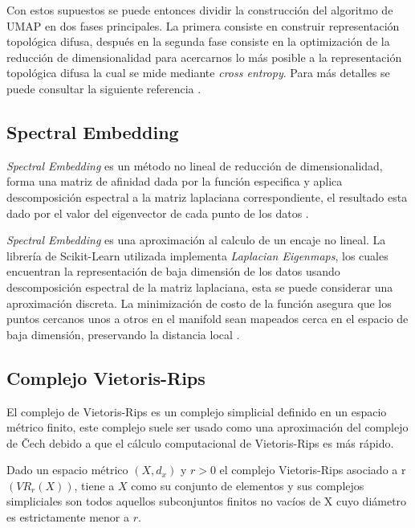 \documentclass{article}
\begin{document}
            Con estos supuestos se puede entonces dividir la construcción del algoritmo de UMAP en dos fases principales. La primera consiste en construir representación topológica difusa, después en la segunda fase consiste en la optimización de la reducción de dimensionalidad para acercarnos lo más posible a la representación topológica difusa la cual se mide mediante \emph{cross entropy}. Para más detalles se puede consultar la siguiente referencia \cite{umapworks}.

        \subsection{Spectral Embedding}

            \emph{Spectral Embedding} es un método no lineal de reducción de dimensionalidad, forma una matriz de afinidad dada por la función especifica y aplica descomposición espectral a la matriz laplaciana correspondiente, el resultado esta dado por el valor del eigenvector de cada punto de los datos \cite{spectral}.

            \emph{Spectral Embedding} es una aproximación al calculo de un encaje no lineal. La librería de Scikit-Learn utilizada implementa \emph{Laplacian Eigenmaps}, los cuales encuentran la representación de baja dimensión de los datos usando descomposición espectral de la matriz laplaciana, esta se puede considerar una aproximación discreta. La minimización de costo de la función asegura que los puntos cercanos unos a otros en el manifold sean mapeados cerca en el espacio de baja dimensión, preservando la distancia local \cite{spectralworks}.

        \subsection{Complejo Vietoris-Rips}

            El complejo de Vietoris-Rips es un complejo simplicial definido en un espacio métrico finito, este complejo suele ser usado como una aproximación del complejo de Čech debido a que el cálculo computacional de Vietoris-Rips es más rápido. \cite{vietoris}

            Dado un espacio métrico $(X,d_x)$ y $r > 0$ el complejo Vietoris-Rips asociado a r  $(VR_r(X))$, tiene a $X$ como su conjunto de elementos y sus complejos simpliciales son todos aquellos subconjuntos finitos no vacíos de X cuyo diámetro es estrictamente menor a $r$.\cite{Sunhyuk}
\end{document}
